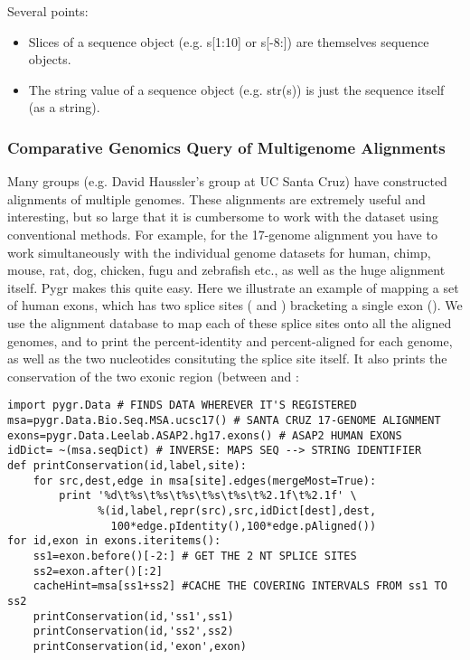 \documentclass{howto}
\begin{document}
Several points:
\begin{itemize}

\item
   Slices of a sequence object (e.g. s[1:10] or s[-8:]) are themselves sequence objects.

\item    
The string value of a sequence object (e.g. str(s)) is just the sequence itself (as a string).

\end{itemize}

\subsubsection{Comparative Genomics Query of Multigenome Alignments}

Many groups (e.g. David Haussler's group at UC Santa Cruz) have constructed alignments of multiple genomes.  These alignments are extremely useful and interesting, but so large that it is cumbersome to work with the dataset using conventional methods.  For example, for the 17-genome alignment you have to work simultaneously with the individual genome datasets for human, chimp, mouse, rat, dog, chicken, fugu and zebrafish etc., as well as the huge alignment itself.  Pygr makes this quite easy.  Here we illustrate an example of mapping a set of human exons, which has two splice sites
( and ) bracketing a single exon ().
We use the alignment database to map each of these splice sites onto all the aligned
genomes, and to print the percent-identity and percent-aligned for each genome,
as well as the two nucleotides consituting the splice site itself.
It also prints the conservation of the two exonic region (between 
and : 

\begin{verbatim}
import pygr.Data # FINDS DATA WHEREVER IT'S REGISTERED
msa=pygr.Data.Bio.Seq.MSA.ucsc17() # SANTA CRUZ 17-GENOME ALIGNMENT
exons=pygr.Data.Leelab.ASAP2.hg17.exons() # ASAP2 HUMAN EXONS
idDict= ~(msa.seqDict) # INVERSE: MAPS SEQ --> STRING IDENTIFIER
def printConservation(id,label,site):
    for src,dest,edge in msa[site].edges(mergeMost=True):
        print '%d\t%s\t%s\t%s\t%s\t%s\t%2.1f\t%2.1f' \
              %(id,label,repr(src),src,idDict[dest],dest,
                100*edge.pIdentity(),100*edge.pAligned())
for id,exon in exons.iteritems():
    ss1=exon.before()[-2:] # GET THE 2 NT SPLICE SITES
    ss2=exon.after()[:2]
    cacheHint=msa[ss1+ss2] #CACHE THE COVERING INTERVALS FROM ss1 TO ss2
    printConservation(id,'ss1',ss1)
    printConservation(id,'ss2',ss2)
    printConservation(id,'exon',exon)
\end{verbatim}
\end{document}
